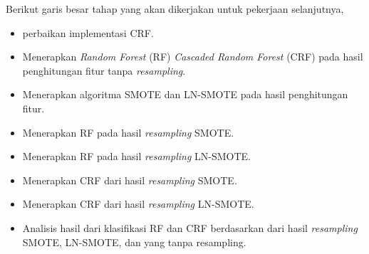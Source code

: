 Berikut garis besar tahap yang akan dikerjakan untuk pekerjaan selanjutnya,

\begin{itemize}
\item perbaikan implementasi CRF.
\item Menerapkan \textit{Random Forest} (RF) \textit{Cascaded Random Forest}
(CRF) pada hasil penghitungan fitur tanpa \textit{resampling}.
\item Menerapkan algoritma SMOTE dan LN-SMOTE pada hasil penghitungan fitur.
\item Menerapkan RF pada hasil \textit{resampling} SMOTE.
\item Menerapkan RF pada hasil \textit{resampling} LN-SMOTE.
\item Menerapkan CRF dari hasil \textit{resampling} SMOTE.
\item Menerapkan CRF dari hasil \textit{resampling} LN-SMOTE.
\item Analisis hasil dari klasifikasi RF dan CRF berdasarkan dari hasil
\textit{resampling} SMOTE, LN-SMOTE, dan yang tanpa resampling.
\end{itemize}

\clearpage
{}

\advisorsignature

\clearpage
{}
\printbibliography

\newpage
\appendix



